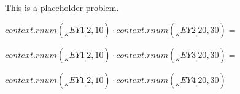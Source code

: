 This is a placeholder problem.
\begin{Problem}
\item ${{context.rnum(__KEY1__, 2, 10)}} \cdot {{context.rnum(__KEY2__, 20, 30)}} =$
\item ${{context.rnum(__KEY1__, 2, 10)}} \cdot {{context.rnum(__KEY3__, 20, 30)}} = $ 
\item ${{context.rnum(__KEY1__, 2, 10)}} \cdot {{context.rnum(__KEY4__, 20, 30)}}$ 
\end{Problem}